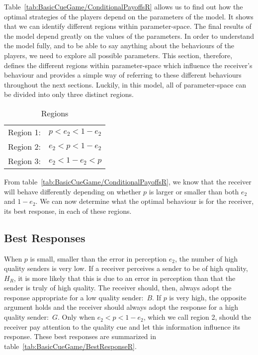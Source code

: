 \documentclass[a4paper,12pt]{article}
\numberwithin{equation}{section}
\begin{document}
Table~\ref{tab:BasicCueGame/ConditionalPayoffsR} allows us to find out how the optimal strategies of the players depend on the parameters of the model. It shows that we can identify different regions within parameter-space. The final results of the model depend greatly on the values of the parameters. In order to understand the model fully, and to be able to say anything about the behaviours of the players, we need to explore all possible parameters. This section, therefore, defines the different regions within parameter-space which influence the receiver's behaviour and provides a simple way of referring to these different behaviours throughout the next sections. Luckily, in this model, all of parameter-space can be divided into only three distinct regions.

\vspace{-4mm}

\begin{table}[h]
\begin{center}
\begin{tabular}{cc}
Region 1: & $p<e_{2}<1-e_{2}$\\
Region 2: & $e_{2}<p<1-e_{2}$\\
Region 3: & $e_{2}<1-e_{2}<p$
\end{tabular}
\end{center}
\caption{Regions}
\label{tab:BasicCueGame/RegionsR}
\end{table}

From table~\ref{tab:BasicCueGame/ConditionalPayoffsR}, we know that the receiver will behave differently depending on whether $p$ is larger or smaller than both $e_{2}$ and $1-e_{2}$. We can now determine what the optimal behaviour is for the receiver, its best response, in each of these regions.


\subsection{Best Responses}
\label{sec:Basic Cue Game/Best Response}

When $p$ is small, smaller than the error in perception $e_{2}$, the number of high quality senders is very low. If a receiver perceives a sender to be of high quality, $H_{R}$, it is more likely that this is due to an error in perception than that the sender is truly of high quality. The receiver should, then, always adopt the response appropriate for a low quality sender:~$B$. If $p$ is very high, the opposite argument holds and the receiver should always adopt the response for a high quality sender:~$G$. Only when $e_{2}<p<1-e_{2}$, which we call region 2, should the receiver pay attention to the quality cue and let this information influence its response. These best responses are summarized in table~\ref{tab:BasicCueGame/BestResponseR}.
\end{document}
